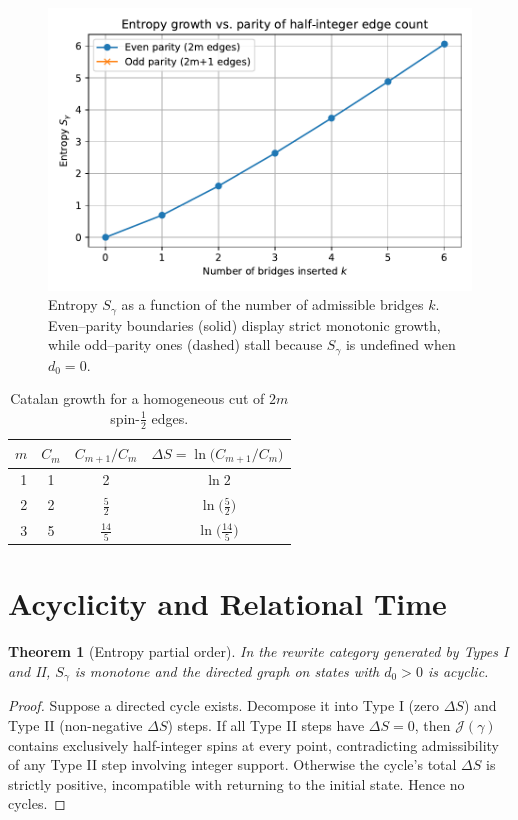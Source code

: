 \documentclass[11pt]{article}
\newtheorem{theorem}{Theorem}[section] \newtheorem{lemma}[theorem]{Lemma} \newtheorem{definition}[theorem]{Definition} \newtheorem{corollary}[theorem]{Corollary} \newtheorem{remark}[theorem]{Remark} \newtheorem{example}[theorem]{Example}
\newcommand{\Cut}{\gamma}
\newcommand{\JS}{\mathcal{J}} %
\begin{document}
\begin{figure}[!htbp]
  \centering
  \includegraphics[width=.7\linewidth]{figures/entropy_growth_even_vs_odd.pdf}%
  \caption{Entropy $S_\gamma$ as a function of the number of admissible
    bridges $k$.  Even–parity boundaries (solid) display strict
    monotonic growth, while odd–parity ones (dashed) stall because
  $S_\gamma$ is undefined when $d_0=0$.}
  \label{fig:entropyGrowth}
\end{figure}


\begin{table}[!htbp]
  \centering
  \caption{Catalan growth for a homogeneous cut of $2m$ spin-$\tfrac12$ edges.}
  \begin{tabular}{@{}rccc@{}}
    \toprule
    $m$ & $C_m$ & $C_{m+1}\!/C_m$ & $\Delta S=\ln\!\bigl(C_{m+1}\!/C_m\bigr)$ \\
    \midrule
    1 & 1 & 2          & $\ln 2$ \\
    2 & 2 & $\tfrac52$ & $\ln\!\bigl(\tfrac52\bigr)$ \\
    3 & 5 & $\tfrac{14}{5}$ & $\ln\!\bigl(\tfrac{14}{5}\bigr)$ \\
    \bottomrule
  \end{tabular}
\end{table}


\section{Acyclicity and Relational Time}\label{sec:acyclic}
\begin{theorem}[Entropy partial order]\label{thm:acyclic} In the rewrite category generated by Types I and II, $S_{\Cut}$ is monotone and the directed graph on states with $d_0>0$ is acyclic.
\end{theorem}
\begin{proof} Suppose a directed cycle exists. Decompose it into Type I (zero $\Delta S$) and Type II (non-negative $\Delta S$) steps. If all Type II steps have $\Delta S=0$, then $\JS(\Cut)$ contains exclusively half-integer spins at every point, contradicting admissibility of any Type II step involving integer support. Otherwise the cycle’s total $\Delta S$ is strictly positive, incompatible with returning to the initial state. Hence no cycles.
\end{proof}
\end{document}

